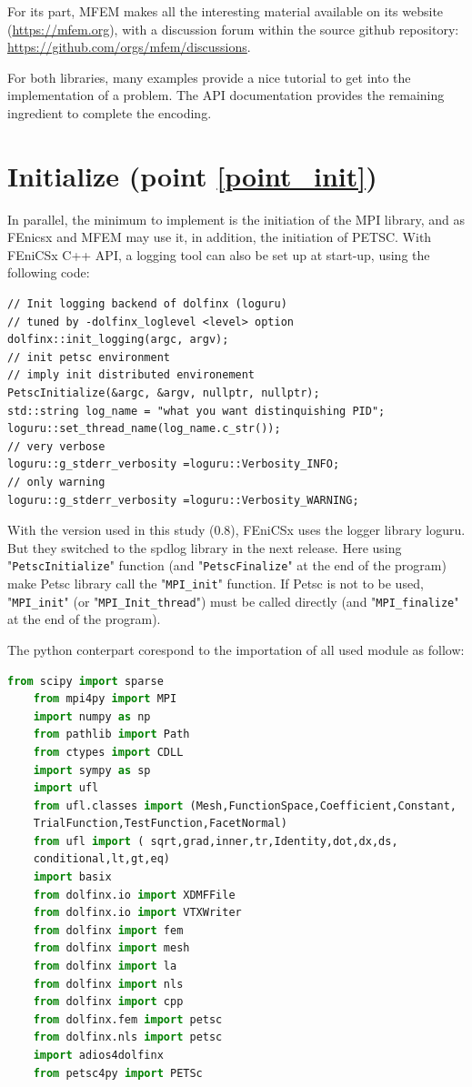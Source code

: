\documentclass[12pt]{article}
\newcommand{\f}[1]{FEniCSx#1}
\newcommand{\mycode}[1]{\textsf{"}\lstinline`#1`\textsf{"}}
\begin{document}
For its part, MFEM makes all the interesting material available on its website (\url{https://mfem.org}), with a discussion forum within the source github repository: \url{https://github.com/orgs/mfem/discussions}.

\bigskip
For both libraries, many examples provide a nice tutorial to get into the implementation of a problem. 
The API documentation provides the remaining ingredient to complete the encoding.
\section{Initialize (point \ref{point_init})}
In parallel, the minimum to implement is the initiation of the MPI library, and as FEnicsx and MFEM may use it, in addition, the initiation of PETSC. 
With \f{} C++ API,   a logging tool can also be set up at start-up, using the following code:
\begin{lstlisting}[numbers=none,basicstyle=\scriptsize]
// Init logging backend of dolfinx (loguru)
// tuned by -dolfinx_loglevel <level> option
dolfinx::init_logging(argc, argv);
// init petsc environment
// imply init distributed environement
PetscInitialize(&argc, &argv, nullptr, nullptr);
std::string log_name = "what you want distinquishing PID";
loguru::set_thread_name(log_name.c_str());
// very verbose
loguru::g_stderr_verbosity =loguru::Verbosity_INFO;
// only warning
loguru::g_stderr_verbosity =loguru::Verbosity_WARNING;
\end{lstlisting}
With the version used in this study (0.8), \f{} uses the logger library loguru. 
But they switched to the spdlog library in the next release.
Here using \mycode{PetscInitialize} function (and \mycode{PetscFinalize} at the end of the program) make Petsc library call the \mycode{MPI_init} function. 
If Petsc is not to be used,  \mycode{MPI_init} (or \mycode{MPI_Init_thread}) must be called directly (and \mycode{MPI_finalize} at the end of the program). 

The python conterpart corespond to the importation of all used module as  follow:
\begin{lstlisting}[numbers=none,basicstyle=\footnotesize,language=Python]
	from scipy import sparse
	from mpi4py import MPI
	import numpy as np
	from pathlib import Path
	from ctypes import CDLL
	import sympy as sp
	import ufl
	from ufl.classes import (Mesh,FunctionSpace,Coefficient,Constant,
	TrialFunction,TestFunction,FacetNormal)
	from ufl import ( sqrt,grad,inner,tr,Identity,dot,dx,ds,
	conditional,lt,gt,eq)
	import basix	
	from dolfinx.io import XDMFFile
	from dolfinx.io import VTXWriter
	from dolfinx import fem
	from dolfinx import mesh
	from dolfinx import la
	from dolfinx import nls
	from dolfinx import cpp
	from dolfinx.fem import petsc
	from dolfinx.nls import petsc
	import adios4dolfinx
	from petsc4py import PETSc
\end{lstlisting}
\end{document}
